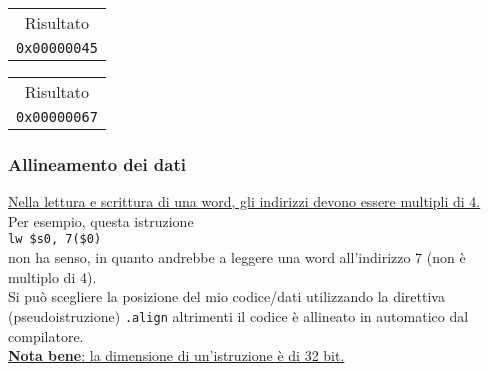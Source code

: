 \documentclass[../main.tex]{subfiles}
\begin{document}
\begin{table}[htb!]
    \centering

    \begin{minipage}{.2\linewidth}
        \centering

        \begin{tabular}{ | c | }
            Risultato \\
            \texttt{0x00000045} \\
        \end{tabular}
    \end{minipage}
    \begin{minipage}{.15\linewidth}
        \centering
        \hspace*{0cm}
    \end{minipage}
    \begin{minipage}{.2\linewidth}
        \centering

        \begin{tabular}{ | c | }
            Risultato \\
            \texttt{0x00000067} \\
        \end{tabular}
    \end{minipage}
\end{table}

\subsubsection*{Allineamento dei dati}
\underline{Nella lettura e scrittura di una word, gli
indirizzi devono essere multipli di 4.}
\\[2mm]
Per esempio, questa istruzione \\
\hspace*{6mm} \texttt{lw \$s0, 7(\$0)} \\
non ha senso, in quanto andrebbe a leggere
una word all'indirizzo 7 (non è multiplo di 4).
\\[1mm]
Si può scegliere la posizione del mio codice/dati utilizzando la direttiva
(pseudoistruzione) \texttt{.align}
altrimenti il codice è allineato in automatico dal compilatore.
\\[1mm]
\underline{\textbf{Nota bene}: la dimensione di un'istruzione è di 32 bit.} \\
\end{document}

